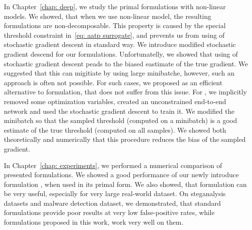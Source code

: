 In Chapter~\ref{chap: deep}, we study the primal formulations with non-linear models. We showed, that when we use non-linear model, the resulting formulations are non-decomposable. This property is caused by the special threshold constraint in~\eqref{eq: aatp surrogate}, and prevents us from using of stochastic gradient descent in standard way. We introduce modified stochastic gradient descend for our formulations. Unfortunatelly, we showed that using of stochastic gradient descent peads to the biased eastimate of the true gradient. We suggested that this can migitiate by using large minibatche, however, such an approach is often not possible. For such cases, we proposed \DeepTopPush as an efficient alternative to \TopPush formulation, that does not suffer from this issue. For \DeepTopPush, we implicitly removed some optimization variables, created an unconstrained end-to-end network and used the stochastic gradient descent to train it. We modified the minibatch so that the sampled threshold (computed on a minibatch) is a good estimate of the true threshold (computed on all samples). We showed both theoretically and numerically that this procedure reduces the bias of the sampled gradient.

In Chapter~\ref{chap: experiments}, we performed a numerical comparison of presented formulations. We showed a good performance of our newly introduce formulation \PatMatNP, when used in its primal form. We also showed, that \DeepTopPush formulation can be very useful, especially for very large real-world dataset. On steganalysis datasets and malware detection dataset, we demonstrated, that standard formulations provide poor results at very low false-positive rates, while formulations proposed in this work, work very well on them.
